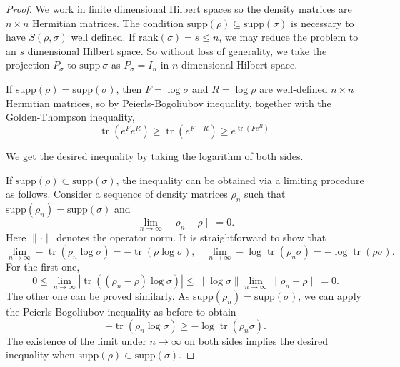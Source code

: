 \documentclass[11pt]{article}
\theoremstyle{definition}
\DeclareMathOperator{\tr}{\text{tr}}
\begin{document}
\begin{proof}
We work in finite dimensional Hilbert spaces so the density matrices are $n\times n$ Hermitian matrices. The condition $\text{supp}(\rho) \subseteq \text{supp}(\sigma)$ is necessary to have  $S(\rho,\sigma)$ well defined. If $\text{rank}(\sigma)=s\leq n$, we may reduce the problem to an $s$ dimensional Hilbert space. So without loss of generality, we take the projection $P_\sigma$ to $\text{supp}~\sigma$  as $P_\sigma=I_n$ in $n$-dimensional Hilbert space. 

If $\text{supp}(\rho) = \text{supp}(\sigma)$, then $F=\log\sigma$ and $R=\log \rho$ are well-defined $n \times n$ Hermitian matrices, so by Peierls-Bogoliubov inequality, together with the Golden-Thompson inequality,
\begin{equation}
    \tr(e^F e^R)\geq \tr(e^{F+R})\geq e^{\tr(Fe^R)}.
\end{equation}

We get the desired inequality by taking the logarithm of both sides.

If $\text{supp}(\rho) \subset \text{supp}(\sigma)$, the inequality can be obtained via a limiting procedure as follows.
Consider a sequence of density matrices ${\rho_n}$ such that $\text{supp}(\rho_n) = \text{supp}(\sigma)$ and
\begin{equation}
    \lim_{n\to\infty}\|\rho_n-\rho\|=0.
\end{equation}
Here $\|\cdot\|$ denotes the operator norm.
It is straightforward to show that 
\begin{equation}
    \lim_{n\to\infty}-\tr(\rho_n\log\sigma)=-\tr(\rho\log\sigma),\quad\lim_{n\to\infty}-\log\tr(\rho_n\sigma)=-\log\tr(\rho\sigma).
\end{equation} 
For the first one,
\begin{equation}
    0 \leq \lim_{n\to\infty}|\tr((\rho_n-\rho)\log\sigma)|\leq \|\log\sigma\|\lim_{n\to\infty}\|\rho_n-\rho\|=0.
\end{equation}
The other one can be proved similarly. As $\text{supp}(\rho_n) = \text{supp}(\sigma)$, we can apply the Peierls-Bogoliubov inequality as before to obtain
\begin{equation}
    -\tr(\rho_n\log\sigma)\geq-\log\tr(\rho_n\sigma).
\end{equation}
The existence of the limit under $n\to\infty$ on both sides implies the desired inequality when $\text{supp}(\rho) \subset \text{supp}(\sigma)$.


\end{proof}
\end{document}
